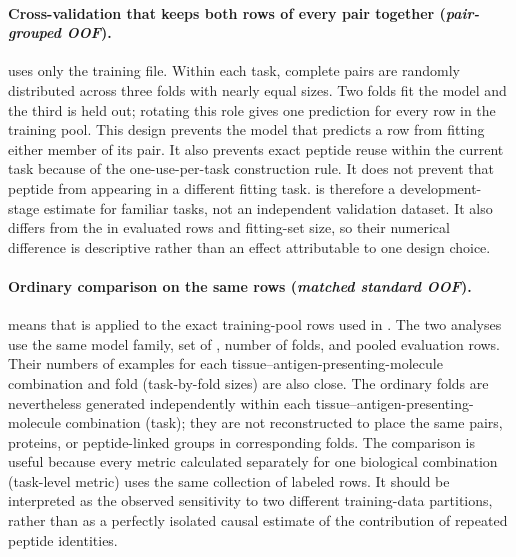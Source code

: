 \paragraph{Cross-validation that keeps both rows of every pair together (\emph{pair-grouped OOF}).}
\plainPairOOF{} uses only the training file. Within each task, complete pairs are randomly distributed across three folds with nearly equal sizes. Two folds fit the model and the third is held out; rotating this role gives one prediction for every row in the training pool. This design prevents the model that predicts a row from fitting either member of its pair. It also prevents exact peptide reuse within the current task because of the one-use-per-task construction rule. It does not prevent that peptide from appearing in a different fitting task. \plainPairOOF{} is therefore a development-stage estimate for familiar tasks, not an independent validation dataset. It also differs from the \plainFixedTest{} in evaluated rows and fitting-set size, so their numerical difference is descriptive rather than an effect attributable to one design choice.

\paragraph{Ordinary comparison on the same rows (\emph{matched standard OOF}).}
\plainMatchedOOF{} means that \plainPairOOF{} is applied to the exact training-pool rows used in \plainPeptideOOF{}. The two analyses use the same model family, set of \plainSeeds{}, number of folds, and pooled evaluation rows. Their numbers of examples for each tissue--antigen-presenting-molecule combination and fold (task-by-fold sizes) are also close. The ordinary folds are nevertheless generated independently within each tissue--antigen-presenting-molecule combination (task); they are not reconstructed to place the same pairs, proteins, or peptide-linked groups in corresponding folds. The comparison is useful because every metric calculated separately for one biological combination (task-level metric) uses the same collection of labeled rows. It should be interpreted as the observed sensitivity to two different training-data partitions, rather than as a perfectly isolated causal estimate of the contribution of repeated peptide identities.

